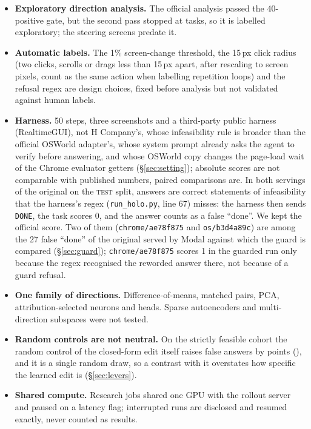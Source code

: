 \begin{itemize}
\item \textbf{Exploratory direction analysis.} The official analysis passed the 40-positive gate, but the second pass stopped at \rtmPassTwoScored{} tasks, so it is labelled exploratory; the steering screens predate it.
\item \textbf{Automatic labels.} The 1\% screen-change threshold, the 15\,px click radius (two clicks, scrolls or drags less than 15\,px apart, after rescaling to screen pixels, count as the same action when labelling repetition loops) and the refusal regex are design choices, fixed before analysis but not validated against human labels.
\item \textbf{Harness.} 50 steps, three screenshots and a third-party public harness (RealtimeGUI), not H Company's, whose infeasibility rule is broader than the official OSWorld adapter's, whose system prompt already asks the agent to verify before answering, and whose OSWorld copy changes the page-load wait of the Chrome evaluator getters (\S\ref{sec:setting}); absolute scores are not comparable with published numbers, paired comparisons are. In both servings of the original on the \textsc{test} split, \cdRegex{} answers are correct statements of infeasibility that the harness's regex (\texttt{run\_holo.py}, line 67) misses: the harness then sends \texttt{DONE}, the task scores 0, and the answer counts as a false ``done''. We kept the official score. Two of them (\texttt{chrome/ae78f875} and \texttt{os/b3d4a89c}) are among the 27 false ``done'' of the original served by Modal against which the guard is compared (\S\ref{sec:guard}); \texttt{chrome/ae78f875} scores 1 in the guarded run only because the regex recognised the reworded answer there, not because of a guard refusal. %
\item \textbf{One family of directions.} Difference-of-means, matched pairs, PCA, attribution-selected neurons and heads. Sparse autoencoders and multi-direction subspaces were not tested.
\item \textbf{Random controls are not neutral.} On the strictly feasible cohort the random control of the closed-form edit itself raises false answers by \pwRandDeltaFsp{} points (\pwRandCiFsp), and it is a single random draw, so a contrast with it overstates how specific the learned edit is (\S\ref{sec:levers}).
\item \textbf{Shared compute.} Research jobs shared one GPU with the rollout server and paused on a latency flag; interrupted runs are disclosed and resumed exactly, never counted as results.
\end{itemize}
